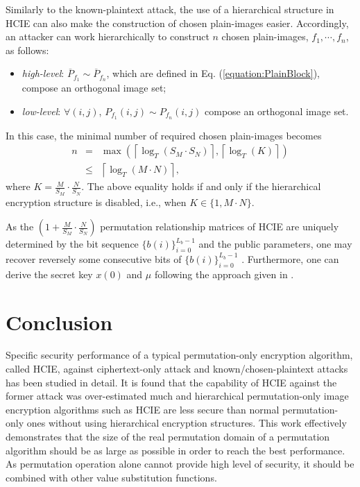 \documentclass[final,3p,times,twocolumn]{elsarticle}
\begin{document}
Similarly to the known-plaintext
attack, the use of a hierarchical structure in HCIE can also make
the construction of chosen plain-images easier. Accordingly, an
attacker can work hierarchically to construct $n$ chosen
plain-images, $f_1,\cdots,f_n$, as follows:
\begin{itemize}
\item \textit{high-level}:
$\overline{P}_{f_1}\sim\overline{P}_{f_n}$, which are defined in
Eq. (\ref{equation:PlainBlock}), compose an orthogonal image set;

\item \textit{low-level}: $\forall(i,j)$, $P_{f_1}(i,j)\sim
P_{f_n}(i,j)$ compose an orthogonal image set.
\end{itemize}
In this case, the minimal number of required chosen plain-images
becomes
\begin{eqnarray}
n & = & \max\left(\left\lceil\log_T(S_M\cdot
S_N)\right\rceil,\left\lceil\log_T\left(K\right)\right\rceil\right)\nonumber\\
& \leq &
\left\lceil\log_T(M\cdot N)\right\rceil,\label{equation:HCIE_plaintext_number}
\end{eqnarray}
where $K=\frac{M}{S_M}\cdot \frac{N}{S_N}$.
The above equality holds if and only if the hierarchical
encryption structure is disabled, i.e., when $K\in\{1, M\cdot N\}$.

As the $\left(1+\frac{M}{S_M}\cdot\frac{N}{S_N}\right)$ permutation relationship matrices of HCIE
are uniquely determined by the bit sequence $\{b(i)\}_{i=0}^{L_b-1}$ and the public parameters, one may recover reversely some consecutive bits of $\{b(i)\}_{i=0}^{L_b-1}$ \cite[Sec.~3.3.6]{Lcq:MCS:JSS10}. Furthermore, one can derive
the secret key $x(0)$ and $\mu$ following the approach given in \cite[Sec.3.3.2]{Li:RCES:JSS2008}.

\section{Conclusion}

Specific security performance of a typical permutation-only encryption algorithm, called HCIE, against ciphertext-only attack and known/chosen-plaintext attacks has been studied in detail. It is found that the capability of HCIE against the former attack was over-estimated much and hierarchical permutation-only image encryption algorithms such as HCIE are less secure than normal permutation-only ones without using hierarchical encryption structures. This work effectively demonstrates that the size of the real permutation domain of a permutation algorithm should be as large as possible in order to reach the best performance. As permutation operation alone cannot provide high level of security, it should be combined with other value substitution functions.
\end{document}
